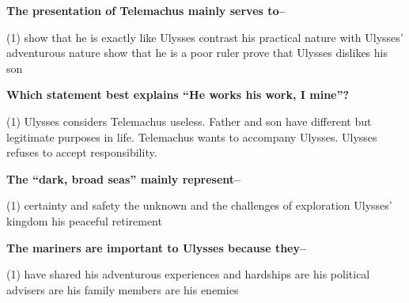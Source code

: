 \documentclass[12pt,a4paper]{exam}
\begin{document}
\begin{questions}

	\begin{minipage}{\textwidth}
		\question \textbf{The presentation of Telemachus mainly serves to--}

		\begin{tasks}(1)
			\task show that he is exactly like Ulysses
			\task contrast his practical nature with Ulysses' adventurous nature
			\task show that he is a poor ruler
			\task prove that Ulysses dislikes his son
		\end{tasks}
	\end{minipage}


	\begin{minipage}{\textwidth}
		\question \textbf{Which statement best explains ``He works his work, I mine''?}

		\begin{tasks}(1)
			\task Ulysses considers Telemachus useless.
			\task Father and son have different but legitimate purposes in life.
			\task Telemachus wants to accompany Ulysses.
			\task Ulysses refuses to accept responsibility.
		\end{tasks}
	\end{minipage}


	\begin{minipage}{\textwidth}
		\question \textbf{The ``dark, broad seas'' mainly represent--}

		\begin{tasks}(1)
			\task certainty and safety
			\task the unknown and the challenges of exploration
			\task Ulysses' kingdom
			\task his peaceful retirement
		\end{tasks}
	\end{minipage}


	\begin{minipage}{\textwidth}
		\question \textbf{The mariners are important to Ulysses because they--}

		\begin{tasks}(1)
			\task have shared his adventurous experiences and hardships
			\task are his political advisers
			\task are his family members
			\task are his enemies
		\end{tasks}
	\end{minipage}


\end{questions}
\end{document}
